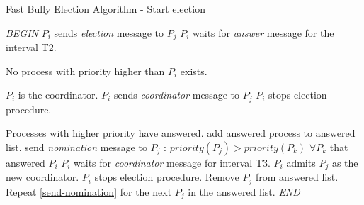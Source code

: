 \documentclass[dareport.tex]{subfiles}
\begin{document}
\begin{algorithm}
	\caption{Fast Bully Election Algorithm -  Start election}
	\label{fast-bully-algorithm-start-election}
	\begin{algorithmic}[1]
		\BState \emph{BEGIN}
				\State $P_{i}$ sends \emph{election} message to $P_{j}$
			\EndFor
			\State $P_{i}$ waits for \emph{answer} message for the interval T2.
				
			\Comment No process with priority higher than $P_{i}$ exists.
				
			\Comment $P_{i}$ is the coordinator.
					\State $P_{i}$ sends \emph{coordinator} message to $P_{j}$
				\EndFor
				\State $P_{i}$ stops election procedure.
			\Else
			
			\Comment Processes with higher priority have answered.
				\State add answered process to answered list.
				\State send \emph{nomination} message to $P_{j}$ : $priority(P_{j}) > priority(P_{k})$ $\forall P_{k}$ that answered  $P_{i}$ \label{send-nomination}
				\State $P_{i}$ waits for \emph{coordinator} message for interval T3.
					\State $P_{i}$ admits $P_{j}$ as the new coordinator.
					\State $P_{i}$ stops election procedure.
				\Else
					\State Remove $P_{j}$ from answered list.
					\State Repeat \cref{send-nomination} for the next $P_{j}$ in the answered list.
						\State {}
					\EndIf
				\EndIf
			\EndIf
		\EndProcedure
		\BState \emph{END}
	\end{algorithmic}
\end{algorithm}
\end{document}

